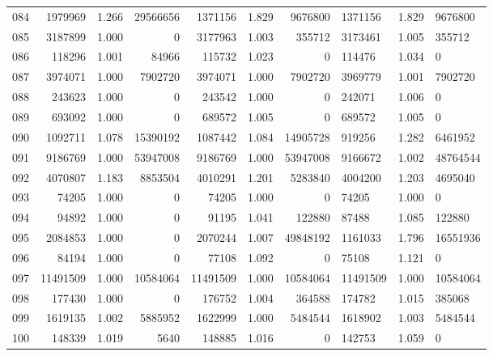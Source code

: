 \begin{longtable}{crrrrrr}
084 & 1979969 & 1.266 & 29566656 & 1371156 & 1.829 & 9676800 & 1371156 & 1.829 & 9676800 \\
085 & 3187899 & 1.000 & 0 & 3177963 & 1.003 & 355712 & 3173461 & 1.005 & 355712 \\
086 & 118296 & 1.001 & 84966 & 115732 & 1.023 & 0 & 114476 & 1.034 & 0 \\
087 & 3974071 & 1.000 & 7902720 & 3974071 & 1.000 & 7902720 & 3969779 & 1.001 & 7902720 \\
088 & 243623 & 1.000 & 0 & 243542 & 1.000 & 0 & 242071 & 1.006 & 0 \\
089 & 693092 & 1.000 & 0 & 689572 & 1.005 & 0 & 689572 & 1.005 & 0 \\
090 & 1092711 & 1.078 & 15390192 & 1087442 & 1.084 & 14905728 & 919256 & 1.282 & 6461952 \\
091 & 9186769 & 1.000 & 53947008 & 9186769 & 1.000 & 53947008 & 9166672 & 1.002 & 48764544 \\
092 & 4070807 & 1.183 & 8853504 & 4010291 & 1.201 & 5283840 & 4004200 & 1.203 & 4695040 \\
093 & 74205 & 1.000 & 0 & 74205 & 1.000 & 0 & 74205 & 1.000 & 0 \\
094 & 94892 & 1.000 & 0 & 91195 & 1.041 & 122880 & 87488 & 1.085 & 122880 \\
095 & 2084853 & 1.000 & 0 & 2070244 & 1.007 & 49848192 & 1161033 & 1.796 & 16551936 \\
096 & 84194 & 1.000 & 0 & 77108 & 1.092 & 0 & 75108 & 1.121 & 0 \\
097 & 11491509 & 1.000 & 10584064 & 11491509 & 1.000 & 10584064 & 11491509 & 1.000 & 10584064 \\
098 & 177430 & 1.000 & 0 & 176752 & 1.004 & 364588 & 174782 & 1.015 & 385068 \\
099 & 1619135 & 1.002 & 5885952 & 1622999 & 1.000 & 5484544 & 1618902 & 1.003 & 5484544 \\
100 & 148339 & 1.019 & 5640 & 148885 & 1.016 & 0 & 142753 & 1.059 & 0 \\
\end{longtable}

